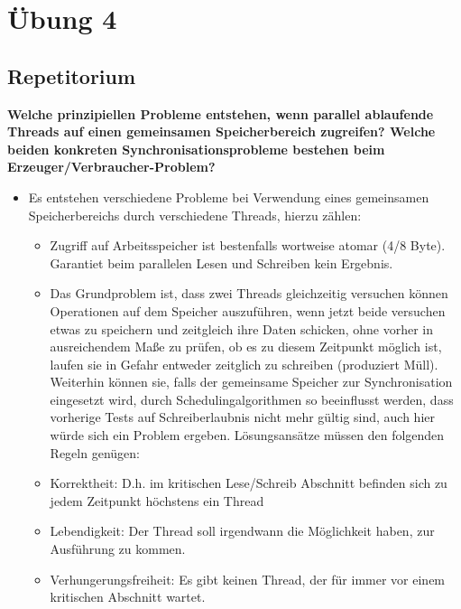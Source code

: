 \documentclass[a4paper]{article}
\begin{document}
\newpage
\section{Übung 4}
\subsection{Repetitorium}
\begin{description*}
    \item \textbf{Welche prinzipiellen Probleme entstehen, wenn parallel ablaufende Threads auf einen gemeinsamen Speicherbereich zugreifen? Welche beiden konkreten Synchronisationsprobleme bestehen beim Erzeuger/Verbraucher-Problem?}
    \begin{itemize}
        \item Es entstehen verschiedene Probleme bei Verwendung eines gemeinsamen Speicherbereichs durch verschiedene Threads, hierzu zählen:
              \begin{itemize}
                  \item Zugriff auf Arbeitsspeicher ist bestenfalls wortweise atomar (4/8 Byte). Garantiet beim parallelen Lesen und Schreiben kein Ergebnis.
                  \item Das Grundproblem ist, dass zwei Threads gleichzeitig versuchen können Operationen auf dem Speicher auszuführen, wenn jetzt beide versuchen etwas zu speichern und zeitgleich ihre Daten schicken, ohne vorher in ausreichendem Maße zu prüfen, ob es zu diesem Zeitpunkt möglich ist, laufen sie in Gefahr entweder zeitglich zu schreiben (produziert Müll). Weiterhin können sie, falls der gemeinsame Speicher zur Synchronisation eingesetzt wird, durch Schedulingalgorithmen so beeinflusst werden, dass vorherige Tests auf Schreiberlaubnis nicht mehr gültig sind, auch hier würde sich ein Problem ergeben. Lösungsansätze müssen den folgenden Regeln genügen:
                  \item Korrektheit: D.h. im kritischen Lese/Schreib Abschnitt befinden sich zu jedem Zeitpunkt höchstens ein Thread
                  \item Lebendigkeit: Der Thread soll irgendwann die Möglichkeit haben, zur Ausführung zu kommen.
                  \item Verhungerungsfreiheit: Es gibt keinen Thread, der für immer vor einem kritischen Abschnitt wartet.
              \end{itemize}

\end{itemize}
\end{description*}
\end{document}
